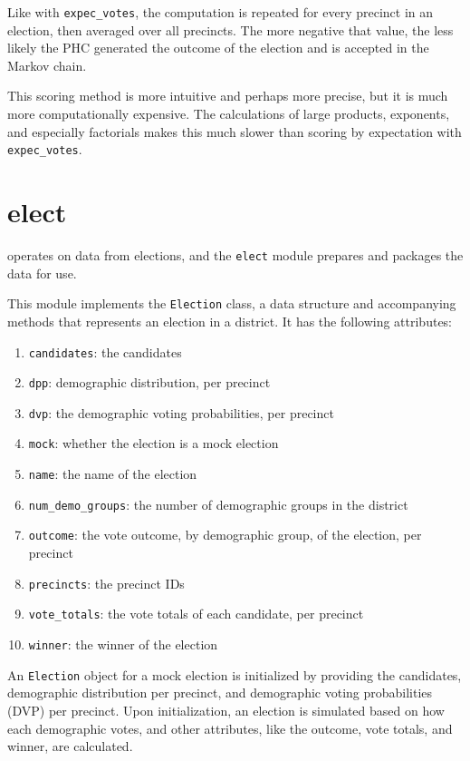 Like with \texttt{expec\_votes}, the computation is repeated for every precinct in an election, then averaged over all precincts. The more negative that value, the less likely the PHC generated the outcome of the election and is accepted in the Markov chain.

This scoring method is more intuitive and perhaps more precise, but it is much more computationally expensive. The calculations of large products, exponents, and especially factorials makes this much slower than scoring by expectation with \texttt{expec\_votes}.

\section{elect}
\label{sec:elect}

 operates on data from elections, and the \texttt{elect} module prepares and packages the data for use.

This module implements the \texttt{Election} class, a data structure and accompanying methods that represents an election in a district. It has the following attributes:

\begin{enumerate}
  \item \texttt{candidates}: the candidates
  \item \texttt{dpp}: demographic distribution, per precinct
  \item \texttt{dvp}: the demographic voting probabilities, per precinct
  \item \texttt{mock}: whether the election is a mock election
  \item \texttt{name}: the name of the election
  \item \texttt{num\_demo\_groups}: the number of demographic groups in the district
  \item \texttt{outcome}: the vote outcome, by demographic group, of the election, per precinct
  \item \texttt{precincts}: the precinct IDs
  \item \texttt{vote\_totals}: the vote totals of each candidate, per precinct
  \item \texttt{winner}: the winner of the election
\end{enumerate}

An \texttt{Election} object for a mock election is initialized by providing the candidates, demographic distribution per precinct, and demographic voting probabilities (DVP) per precinct. Upon initialization, an election is simulated based on how each demographic votes, and other attributes, like the outcome, vote totals, and winner, are calculated.

